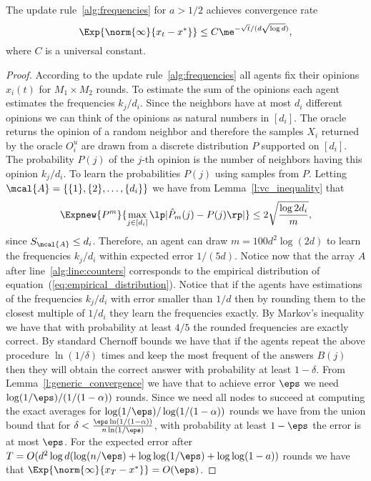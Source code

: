 \begin{theorem}
  The update rule~\ref{alg:frequencies} for $a > 1/2$ achieves
  convergence rate
  \[
    \Exp{\norm{\infty}{x_t- x^*}}
    \leq C \me^{-\sqrt{t}/(d\sqrt{\log{d}})},
\]
where $C$ is a universal constant.
\end{theorem}
\begin{proof}
  According to the update rule~\ref{alg:frequencies}
  all agents fix their opinions $x_i(t)$ for $M_1 \times M_2$ rounds.
  To estimate the sum of the opinions each agent estimates the
  frequencies $k_j/d_i$. Since the neighbors have at most $d_i$
  different opinions we can think of the opinions as natural
  numbers in $[d_i]$.  The oracle returns the opinion
  of a random neighbor and therefore the samples $X_i$ returned by
  the oracle $O_i^u$ are drawn from a discrete distribution
  $P$ supported on $[d_i]$.
  The probability $P(j)$ of the $j$-th opinion is the number of neighbors
  having this opinion $k_j/d_i$.
  To learn the probabilities $P(j)$ using samples from $P$.
  Letting $\mcal{A} = \{\{1\},\{2\},\ldots, \{d_i\}\}$ we have from
  Lemma~\ref{l:vc_inequality} that
  \[
    \Expnew{P^m}{\max_{j \in [d_i]} \lp| \hat{P}_m(j) - P(j) \rp|}
    \leq 2 \sqrt{\frac{\log{2 d_i}}{m}},
  \]
  since $S_{\mcal{A}} \leq d_i$. Therefore, an agent can draw
  $m = 100 d^2 \log(2 d)$ to learn the frequencies $k_j/d_i$
  within expected error $1/(5 d)$.
  Notice now that the array $A$ after line~\ref{alg:line:counters}
  corresponds to the empirical distribution of
  equation~(\ref{eq:empirical_distribution}).
  Notice that if the agents have estimations of the frequencies $k_j/d_i$
  with error smaller than $1/d$ then by rounding them to the closest
  multiple of $1/d_i$ they learn the frequencies exactly.
  By Markov's inequality we have that with probability at least $4/5$ the
  rounded frequencies are exactly correct. By standard Chernoff bounds we
  have that if the agents repeat the above procedure
  $\ln(1/\delta)$ times and
  keep the most frequent of the answers $B(j)$ then they will
  obtain the correct answer with probability at least
  $1-\delta$. From Lemma~\ref{l:generic_convergence} we have
  that to achieve error $\eps$ we need $\log(1/\eps)/(1/(1-\alpha))$ rounds.
  Since we need all nodes to succeed at computing the exact averages for
$\log(1/\eps)/\log(1/(1-\alpha))$ rounds we have from the union bound that for
$\delta < \frac{\eps \ln(1/(1-\alpha))}{n \ln(1/\eps)}$, with
probability at least $1-\eps$ the error is at most $\eps$.
For the expected error after
$T = O(d^2 \log d ( \log(n/\eps) + \log \log(1/\eps) + \log \log (1-a))$ rounds
we have that $\Exp{\norm{\infty}{x_T - x^*}} = O(\eps)$.
\end{proof}
